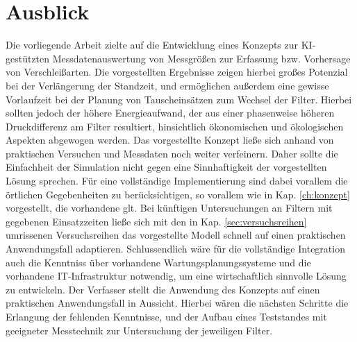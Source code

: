     \section{Ausblick}
    Die vorliegende Arbeit zielte auf die Entwicklung eines Konzepts zur KI-gestützten Messdatenauswertung von Messgrößen zur Erfassung bzw. Vorhersage von Verschleißarten.
    Die vorgestellten Ergebnisse zeigen hierbei großes Potenzial bei der Verlängerung der Standzeit, und ermöglichen außerdem eine gewisse Vorlaufzeit bei der Planung von Tauscheinsätzen zum Wechsel der Filter. Hierbei sollten jedoch der höhere Energieaufwand, der aus einer phasenweise höheren Druckdifferenz am Filter resultiert, hinsichtlich ökonomischen und ökologischen Aspekten abgewogen werden. Das vorgestellte Konzept ließe sich anhand von praktischen Versuchen und Messdaten noch weiter verfeinern. Daher sollte die Einfachheit der Simulation nicht gegen eine Sinnhaftigkeit der vorgestellten Lösung sprechen. Für eine vollständige Implementierung sind dabei vorallem die örtlichen Gegebenheiten zu berücksichtigen, so vorallem wie in Kap. \ref{ch:konzept} vorgestellt, die vorhandene \ac{glt}. Bei künftigen Untersuchungen an Filtern mit gegebenen Einsatzzeiten ließe sich mit den in Kap. \ref{sec:versuchsreihen} umrissenen Versuchsreihen das vorgestellte Modell schnell auf einen praktischen Anwendungsfall adaptieren. Schlussendlich wäre für die vollständige Integration auch die Kenntniss über vorhandene Wartungsplanungssysteme und die vorhandene IT-Infrastruktur notwendig, um eine wirtschaftlich sinnvolle Lösung zu entwickeln. Der Verfasser stellt die Anwendung des Konzepts auf einen praktischen Anwendungsfall in Aussicht. Hierbei wären die nächsten Schritte die Erlangung der fehlenden Kenntnisse, und der Aufbau eines Teststandes mit geeigneter Messtechnik zur Untersuchung der jeweiligen Filter. 